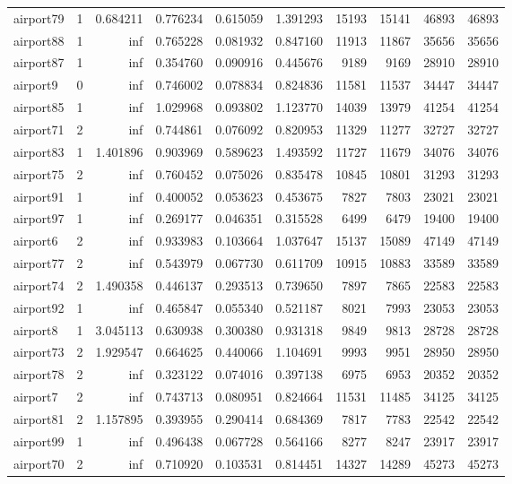 \begin{longtable}{|l|r|r|r|r|r|r|r|r|r|}
airport79 & 1 & 0.684211 & 0.776234 & 0.615059 & 1.391293 & 15193 & 15141 & 46893 & 46893 \\
airport88 & 1 & inf & 0.765228 & 0.081932 & 0.847160 & 11913 & 11867 & 35656 & 35656 \\
airport87 & 1 & inf & 0.354760 & 0.090916 & 0.445676 & 9189 & 9169 & 28910 & 28910 \\
airport9 & 0 & inf & 0.746002 & 0.078834 & 0.824836 & 11581 & 11537 & 34447 & 34447 \\
airport85 & 1 & inf & 1.029968 & 0.093802 & 1.123770 & 14039 & 13979 & 41254 & 41254 \\
airport71 & 2 & inf & 0.744861 & 0.076092 & 0.820953 & 11329 & 11277 & 32727 & 32727 \\
airport83 & 1 & 1.401896 & 0.903969 & 0.589623 & 1.493592 & 11727 & 11679 & 34076 & 34076 \\
airport75 & 2 & inf & 0.760452 & 0.075026 & 0.835478 & 10845 & 10801 & 31293 & 31293 \\
airport91 & 1 & inf & 0.400052 & 0.053623 & 0.453675 & 7827 & 7803 & 23021 & 23021 \\
airport97 & 1 & inf & 0.269177 & 0.046351 & 0.315528 & 6499 & 6479 & 19400 & 19400 \\
airport6 & 2 & inf & 0.933983 & 0.103664 & 1.037647 & 15137 & 15089 & 47149 & 47149 \\
airport77 & 2 & inf & 0.543979 & 0.067730 & 0.611709 & 10915 & 10883 & 33589 & 33589 \\
airport74 & 2 & 1.490358 & 0.446137 & 0.293513 & 0.739650 & 7897 & 7865 & 22583 & 22583 \\
airport92 & 1 & inf & 0.465847 & 0.055340 & 0.521187 & 8021 & 7993 & 23053 & 23053 \\
airport8 & 1 & 3.045113 & 0.630938 & 0.300380 & 0.931318 & 9849 & 9813 & 28728 & 28728 \\
airport73 & 2 & 1.929547 & 0.664625 & 0.440066 & 1.104691 & 9993 & 9951 & 28950 & 28950 \\
airport78 & 2 & inf & 0.323122 & 0.074016 & 0.397138 & 6975 & 6953 & 20352 & 20352 \\
airport7 & 2 & inf & 0.743713 & 0.080951 & 0.824664 & 11531 & 11485 & 34125 & 34125 \\
airport81 & 2 & 1.157895 & 0.393955 & 0.290414 & 0.684369 & 7817 & 7783 & 22542 & 22542 \\
airport99 & 1 & inf & 0.496438 & 0.067728 & 0.564166 & 8277 & 8247 & 23917 & 23917 \\
airport70 & 2 & inf & 0.710920 & 0.103531 & 0.814451 & 14327 & 14289 & 45273 & 45273 \\

\end{longtable}
